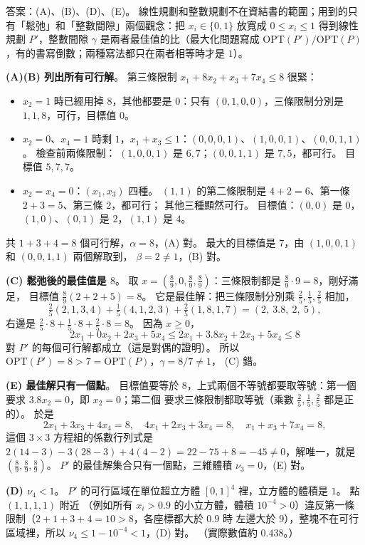 \begin{pastsoln}
答案：(A)、(B)、(D)、(E)。 線性規劃和整數規劃不在資結書的範圍；用到的只有「鬆弛」和「整數間隙」兩個觀念：把
$x_i \in \{0, 1\}$ 放寬成 $0 \le x_i \le 1$ 得到線性規劃 $P'$，整數間隙 $\gamma$ 是兩者最佳值的比（最大化問題寫成
$\mathrm{OPT}(P') / \mathrm{OPT}(P)$，有的書寫倒數；兩種寫法都只在兩者相等時才是 $1$）。

\textbf{(A)(B) 列出所有可行解}。 第三條限制 $x_1 + 8x_2 + x_3 + 7x_4 \le 8$ 很緊：
\begin{itemize}
\item $x_2 = 1$ 時已經用掉 $8$，其他都要是 $0$：只有 $(0,1,0,0)$，三條限制分別是 $1, 1, 8$，可行，目標值 $0$。
\item $x_2 = 0$、$x_4 = 1$ 時剩 $1$，$x_1 + x_3 \le 1$：$(0,0,0,1)$、$(1,0,0,1)$、$(0,0,1,1)$。 檢查前兩條限制：
$(1,0,0,1)$ 是 $6, 7$；$(0,0,1,1)$ 是 $7, 5$，都可行。 目標值 $5, 7, 7$。
\item $x_2 = x_4 = 0$：$(x_1, x_3)$ 四種。 $(1, 1)$ 的第二條限制是 $4 + 2 = 6$、第一條 $2 + 3 = 5$、第三條 $2$，都可行；
其他三種顯然可行。 目標值：$(0,0)$ 是 $0$，$(1,0)$、$(0,1)$ 是 $2$，$(1,1)$ 是 $4$。
\end{itemize}
共 $1 + 3 + 4 = 8$ 個可行解，$\alpha = 8$，(A) 對。 最大的目標值是 $7$，由 $(1,0,0,1)$ 和 $(0,0,1,1)$ 兩個解取到，
$\beta = 2 \ne 1$，(B) 對。

\textbf{(C) 鬆弛後的最佳值是 $8$}。 取 $x = (\frac89, 0, \frac89, \frac89)$：三條限制都是 $\frac89 \cdot 9 = 8$，剛好滿足，
目標值 $\frac89 (2 + 2 + 5) = 8$。 它是最佳解：把三條限制分別乘 $\frac25, \frac15, \frac25$ 相加，
\[
\tfrac25(2, 1, 3, 4) + \tfrac15(4, 1, 2, 3) + \tfrac25(1, 8, 1, 7) = (2,\ 3.8,\ 2,\ 5),
\]
右邊是 $\frac25 \cdot 8 + \frac15 \cdot 8 + \frac25 \cdot 8 = 8$。 因為 $x \ge 0$，
\[
2x_1 + 0x_2 + 2x_3 + 5x_4 \le 2x_1 + 3.8x_2 + 2x_3 + 5x_4 \le 8
\]
對 $P'$ 的每個可行解都成立（這是對偶的證明）。 所以 $\mathrm{OPT}(P') = 8 > 7 = \mathrm{OPT}(P)$，$\gamma = 8/7 \ne 1$，
(C) 錯。

\textbf{(E) 最佳解只有一個點}。 目標值要等於 $8$，上式兩個不等號都要取等號：第一個要求 $3.8 x_2 = 0$，即 $x_2 = 0$；第二個
要求三條限制都取等號（乘數 $\frac25, \frac15, \frac25$ 都是正的）。 於是
\[
2x_1 + 3x_3 + 4x_4 = 8,\quad 4x_1 + 2x_3 + 3x_4 = 8,\quad x_1 + x_3 + 7x_4 = 8 ,
\]
這個 $3 \times 3$ 方程組的係數行列式是 $2(14 - 3) - 3(28 - 3) + 4(4 - 2) = 22 - 75 + 8 = -45 \ne 0$，解唯一，就是
$(\frac89, \frac89, \frac89)$。 $P'$ 的最佳解集合只有一個點，三維體積 $\nu_3 = 0$，(E) 對。

\textbf{(D) $\nu_4 < 1$}。 $P'$ 的可行區域在單位超立方體 $[0, 1]^4$ 裡，立方體的體積是 $1$。 點 $(1, 1, 1, 1)$ 附近
（例如所有 $x_i > 0.9$ 的小立方體，體積 $10^{-4} > 0$）違反第一條限制（$2 + 1 + 3 + 4 = 10 > 8$，各座標都大於 $0.9$ 時
左邊大於 $9$），整塊不在可行區域裡，所以 $\nu_4 \le 1 - 10^{-4} < 1$，(D) 對。 （實際數值約 $0.438$。）
\end{pastsoln}
